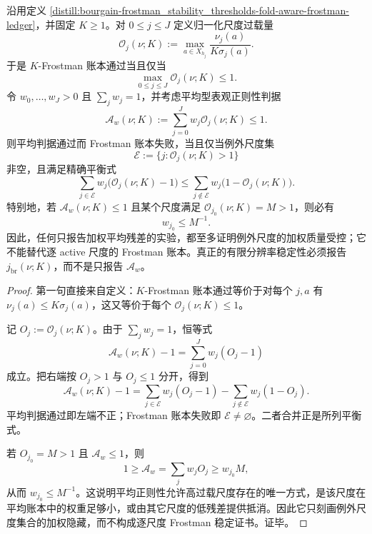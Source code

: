 \begin{proposition}[平均型表观正则性的例外尺度等价式]\label{distill:bourgain-frostman_stability_thresholds-average-regularity-exceptional-scale-equivalence}
沿用定义 \ref{distill:bourgain-frostman_stability_thresholds-fold-aware-frostman-ledger}，并固定 \(K\ge1\)。对 \(0\le j\le J\) 定义归一化尺度过载量
\[
\mathcal O_j(\nu;K):=\max_{a\in X_{h_j}}\frac{\nu_j(a)}{K\sigma_j(a)}.
\]
于是 \(K\)-Frostman 账本通过当且仅当
\[
\max_{0\le j\le J}\mathcal O_j(\nu;K)\le1.
\]
令 \(w_0,\dots,w_J>0\) 且 \(\sum_jw_j=1\)，并考虑平均型表观正则性判据
\[
\mathcal A_w(\nu;K):=\sum_{j=0}^{J}w_j\mathcal O_j(\nu;K)\le1.
\]
则平均判据通过而 Frostman 账本失败，当且仅当例外尺度集
\[
\mathcal E:=\{j:\mathcal O_j(\nu;K)>1\}
\]
非空，且满足精确平衡式
\[
\sum_{j\in\mathcal E}w_j\bigl(\mathcal O_j(\nu;K)-1\bigr)
\le
\sum_{j\notin\mathcal E}w_j\bigl(1-\mathcal O_j(\nu;K)\bigr).
\]
特别地，若 \(\mathcal A_w(\nu;K)\le1\) 且某个尺度满足 \(\mathcal O_{j_0}(\nu;K)=M>1\)，则必有
\[
w_{j_0}\le M^{-1}.
\]
因此，任何只报告加权平均残差的实验，都至多证明例外尺度的加权质量受控；它不能替代逐 active 尺度的 Frostman 账本。真正的有限分辨率稳定性必须报告 \(j_{\mathrm{br}}(\nu;K)\)，而不是只报告 \(\mathcal A_w\)。
\end{proposition}
\begin{proof}
第一句直接来自定义：\(K\)-Frostman 账本通过等价于对每个 \(j,a\) 有 \(\nu_j(a)\le K\sigma_j(a)\)，这又等价于每个 \(\mathcal O_j(\nu;K)\le1\)。

记 \(O_j:=\mathcal O_j(\nu;K)\)。由于 \(\sum_jw_j=1\)，恒等式
\[
\mathcal A_w(\nu;K)-1=\sum_{j=0}^{J}w_j(O_j-1)
\]
成立。把右端按 \(O_j>1\) 与 \(O_j\le1\) 分开，得到
\[
\mathcal A_w(\nu;K)-1
=\sum_{j\in\mathcal E}w_j(O_j-1)
-\sum_{j\notin\mathcal E}w_j(1-O_j).
\]
平均判据通过即左端不正；Frostman 账本失败即 \(\mathcal E\ne\varnothing\)。二者合并正是所列平衡式。

若 \(O_{j_0}=M>1\) 且 \(\mathcal A_w\le1\)，则
\[
1\ge\mathcal A_w=\sum_jw_jO_j\ge w_{j_0}M,
\]
从而 \(w_{j_0}\le M^{-1}\)。这说明平均正则性允许高过载尺度存在的唯一方式，是该尺度在平均账本中的权重足够小，或由其它尺度的低残差提供抵消。因此它只刻画例外尺度集合的加权隐藏，而不构成逐尺度 Frostman 稳定证书。证毕。
\end{proof}


